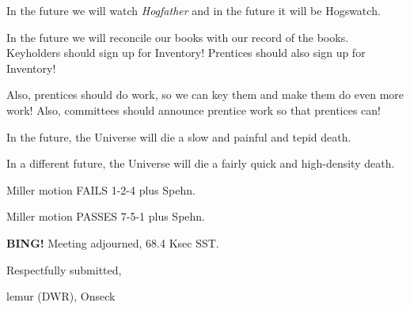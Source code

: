 \documentclass[10pt]{article}
\newcommand{\bing}{{\bf BING!} }
\newcommand{\ps}{ plus Spehn\xspace}
\newcommand{\onseck}{lemur (DWR), Onseck}
\begin{document}
In the future we will watch \emph{Hogfather} and in the future it will
be Hogswatch.

In the future we will reconcile our books with our record of the books.
Keyholders should sign up for Inventory!  Prentices should also sign up
for Inventory!

Also, prentices should do work, so we can key them and make them do
even more work!  Also, committees should announce prentice work so
that prentices can!

In the future, the Universe will die a slow and painful and tepid death.

In a different future, the Universe will die a fairly quick and high-density
death.

Miller motion FAILS 1-2-4\ps.

Miller motion PASSES 7-5-1\ps.

\bing
\noindent
Meeting adjourned, 68.4 Ksec SST.

\vspace{18pt}

\centerline{Respectfully submitted,}
\centerline{\onseck}
\end{document}
